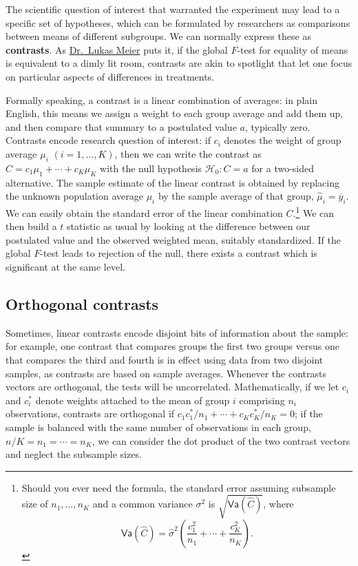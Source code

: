 \documentclass[
  11pt,
  letterpaper,
]{scrbook}
\theoremstyle{definition}
\theoremstyle{remark}
\begin{document}
The scientific question of interest that warranted the experiment may
lead to a specific set of hypotheses, which can be formulated by
researchers as comparisons between means of different subgroups. We can
normally express these as \textbf{contrasts}. As
\href{https://stat.ethz.ch/~meier}{Dr.~Lukas Meier} puts it, if the
global \(F\)-test for equality of means is equivalent to a dimly lit
room, contrasts are akin to spotlight that let one focus on particular
aspects of differences in treatments.

Formally speaking, a contrast is a linear combination of averages: in
plain English, this means we assign a weight to each group average and
add them up, and then compare that summary to a postulated value \(a\),
typically zero. Contrasts encode research question of interest: if
\(c_i\) denotes the weight of group average \(\mu_i\)
\((i=1, \ldots, K)\), then we can write the contrast as
\(C = c_1 \mu_1 + \cdots + c_K \mu_K\) with the null hypothesis
\(\mathscr{H}_0: C=a\) for a two-sided alternative. The sample estimate
of the linear contrast is obtained by replacing the unknown population
average \(\mu_i\) by the sample average of that group,
\(\widehat{\mu}_i = \overline{y}_{i}\). We can easily obtain the
standard error of the linear combination \(C.\)\footnote{Should you ever
  need the formula, the standard error assuming subsample size of
  \(n_1, \ldots, n_K\) and a common variance \(\sigma^2\) is
  \(\sqrt{\mathsf{Va}(\widehat{C})}\), where
  \[\mathsf{Va}(\widehat{C}) = \widehat{\sigma}^2\left(\frac{c_1^2}{n_1} + \cdots + \frac{c_K^2}{n_K}\right).\]}
We can then build a \(t\) statistic as usual by looking at the
difference between our postulated value and the observed weighted mean,
suitably standardized. If the global \(F\)-test leads to rejection of
the null, there exists a contrast which is significant at the same
level.

\hypertarget{orthogonal-contrasts}{%
\subsection{Orthogonal contrasts}\label{orthogonal-contrasts}}

Sometimes, linear contrasts encode disjoint bits of information about
the sample: for example, one contrast that compares groups the first two
groups versus one that compares the third and fourth is in effect using
data from two disjoint samples, as contrasts are based on sample
averages. Whenever the contrasts vectors are orthogonal, the tests will
be uncorrelated. Mathematically, if we let \(c_{i}\) and \(c^{*}_{i}\)
denote weights attached to the mean of group \(i\) comprising \(n_i\)
observations, contrasts are orthogonal if
\(c_{1}c^{*}_{1}/n_1 + \cdots + c_{K}c^{*}_K/n_K = 0\); if the sample is
balanced with the same number of observations in each group,
\(n/K = n_1 =\cdots = n_K\), we can consider the dot product of the two
contrast vectors and neglect the subsample sizes.
\end{document}
